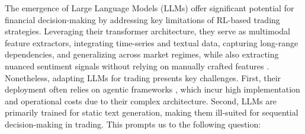 
The emergence of Large Language Models (LLMs) offer significant potential for financial decision-making by addressing key limitations of RL-based trading strategies. Leveraging their transformer architecture, they serve as multimodal feature extractors, integrating time-series and textual data, capturing long-range dependencies, and generalizing across market regimes, while also extracting nuanced sentiment signals without relying on manually crafted features \cite{chen2021decision,yang2023fingpt,jin2023time,wood2021trading,yu2024finmem,deng2023llms}. Nonetheless, adapting LLMs for trading presents key challenges. First, their deployment often relies on agentic frameworks \cite{li2024cryptotrade,li2023tradinggpt,yu2025fincon}, which incur high implementation and operational costs due to their complex architecture. Second, LLMs are primarily trained for static text generation, making them ill-suited for sequential decision-making in trading.  This prompts us to the following question:

